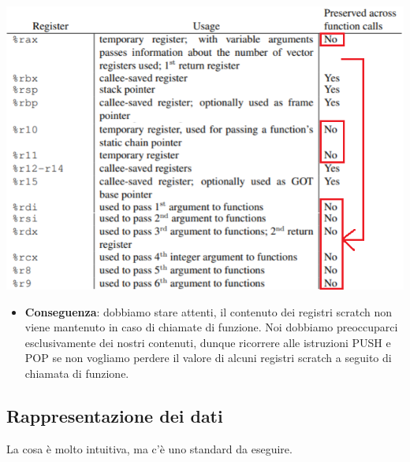 \documentclass[11pt]{report}
\theoremstyle{definition}
\begin{document}
\begin{center}
	\includegraphics{img/269.PNG}
\end{center} 
\begin{itemize}
\item \textbf{Conseguenza}: dobbiamo stare attenti, il contenuto dei registri scratch non viene mantenuto in caso di chiamate di funzione. Noi dobbiamo preoccuparci esclusivamente dei nostri contenuti, dunque ricorrere alle istruzioni PUSH e POP se non vogliamo perdere il valore di alcuni registri scratch a seguito di chiamata di funzione.
\end{itemize}
\clearpage 

\subsection{Rappresentazione dei dati}
La cosa è molto intuitiva, ma c'è uno standard da eseguire. 
\end{document}

